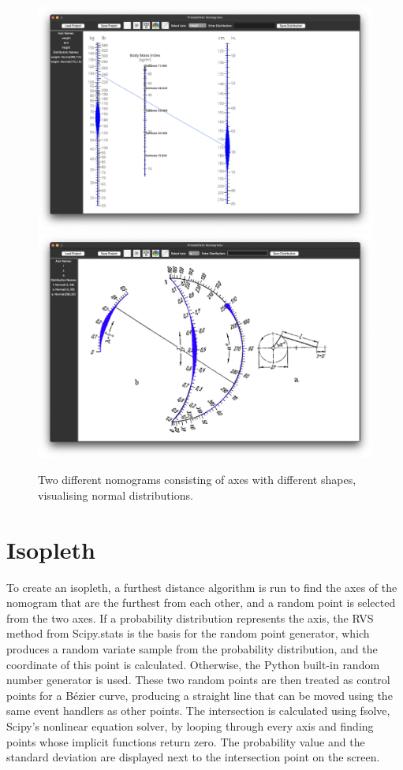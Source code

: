 \documentclass{l4proj}
\begin{document}
\begin{figure} [H]
    \centering
    \includegraphics[width=0.75\linewidth]{dissertation//images//myFigures//implementation/probability1.png}
    \includegraphics[width=0.75\linewidth]{dissertation//images//myFigures//implementation/probability2.png}    
    \caption{Two different nomograms consisting of axes with different shapes, visualising normal distributions.  }
    \label{fig:prob-visualisation}
\end{figure}

\section{Isopleth}

To create an isopleth, a furthest distance algorithm is run to find the axes of the nomogram that are the furthest from each other, and a random point is selected from the two axes. If a probability distribution represents the axis, the RVS method from Scipy.stats is the basis for the random point generator, which produces a random variate sample from the probability distribution, and the coordinate of this point is calculated. Otherwise, the Python built-in random number generator is used. These two random points are then treated as control points for a Bézier curve, producing a straight line that can be moved using the same event handlers as other points. The intersection is calculated using fsolve, Scipy's nonlinear equation solver, by looping through every axis and finding points whose implicit functions return zero. The probability value and the standard deviation are displayed next to the intersection point on the screen. 
\end{document}
